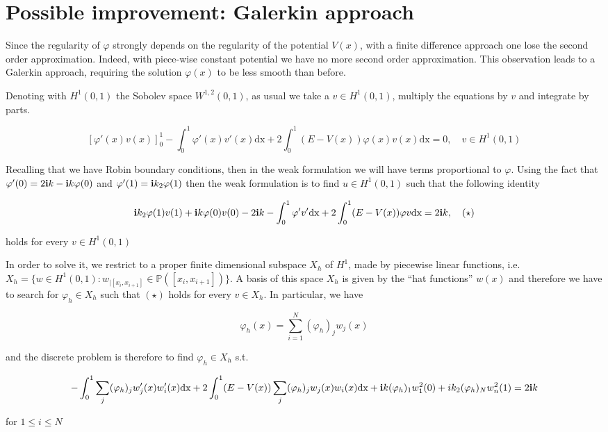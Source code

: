 \documentclass[a4paper,oneside]{book}
\theoremstyle{definition}
\theoremstyle{plain}
\newcommand{\var}{\varphi}
\begin{document}
\section{Possible improvement:  Galerkin approach}

Since the regularity of $\var$ strongly depends on the regularity of the potential $V(x)$, with a finite difference approach one lose the second order approximation. Indeed, with piece-wise constant potential we have no more second order approximation. This observation leads to a Galerkin approach, requiring the solution $\var(x)$ to be less smooth than before. 

Denoting with $H^1(0,1)$ the Sobolev space $W^{1,2}(0,1)$, as usual we take a $v \in H^1(0,1)$, multiply the equations by $v$ and integrate by parts.

%



\[
[\var '(x) v(x)]_{0}^{1} - \int_{0}^{1} \var '(x) v'(x)  \text{dx}+ 2 \int_0^1 (E-V(x))\var (x) v(x) \text{dx} =0, \quad v \in H^1(0,1)
\]

Recalling that we have Robin boundary conditions, then in the weak formulation we will have terms proportional to $\var $. Using the fact that $\var'(0)=2 \bold{i} k - \bold{i} k \var(0)$ and $\var'(1)=\bold{i}k_2 \var(1)$ then the weak formulation is to find $u \in H^1(0,1)$ such that the following identity 

\[ 
\bold{i} k_2 \var(1)v(1) + \bold{i} k \var(0) v(0) -2 \bold{i}k - \int_0^1 \var' v' \text{dx} + 2 \int_0^1(E-V(x)) \var v \text{dx} = 2 \bold{i}k, 	\quad (\star)
\]

holds for every $v \in H^1(0,1)$

In order to solve it, we restrict to a proper finite dimensional subspace $X_h$ of $H^1$, made by piecewise linear functions, i.e. $X_h= \{ w \in H^1(0,1): w_{|[x_i,x_{i+1}]} \in \mathbb{P}([x_i,x_{i+1}])\}$. A basis of this space $X_h$ is given by the ``hat functions'' $w(x)$ and therefore we have to search for $\var_h \in X_h$ such that $(\star)$ holds for every $v \in X_h$. In particular, we have 

\[ 
\var_h(x)=\sum_{i=1}^{N} (\var_h)_j w_j(x)
\]

and the discrete problem is therefore to find $\var_h \in X_h$ s.t.

\[
-\int_0^1  \sum_j (\var_h)_j w_j'(x) w_i'(x) \text{dx} + 2 \int_0^1 (E-V(x)) \sum_j (\var_h)_j w_j(x) w_i(x) \text{dx} + \bold{i}k (\var_h)_1 w_{1}^{2}(0) + i k_2 (\var_h)_N w_n^{2}(1)= 2 \bold{i} k
\]

for $1\leq i \leq N$ 
\end{document}
